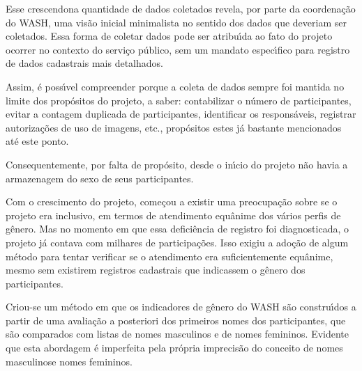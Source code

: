 \documentclass[
12pt,		%
openright,	%
twoside,  %
a4paper,			%
chapter=TITLE,		%
english,			%
french,				%
spanish,			%
brazil				%
]{USPSC-classe/USPSC}
\begin{document}
Esse \textquotedbl crescendo\textquotedbl  na quantidade de dados coletados revela, por parte da coordena\c{c}\~ao do WASH, uma vis\~ao inicial minimalista no sentido dos dados que deveriam ser coletados. Essa forma de coletar dados pode ser atribu\'{\i}da ao fato do projeto ocorrer no contexto do servi\c{c}o p\'ublico, sem um mandato espec\'{\i}fico para registro de dados cadastrais mais detalhados.









Assim, \'e poss\'{\i}vel compreender porque a coleta de dados sempre foi mantida no limite dos prop\'ositos do projeto, a saber: contabilizar o n\'umero de participantes, evitar a contagem duplicada de participantes, identificar os respons\'aveis, registrar autoriza\c{c}\~oes de uso de imagens, etc., prop\'ositos estes j\'a bastante mencionados at\'e este ponto.









Consequentemente, por falta de prop\'osito, desde o in\'{\i}cio do projeto n\~ao havia a armazenagem do sexo de seus participantes.









Com o crescimento do projeto, come\c{c}ou a existir uma preocupa\c{c}\~ao sobre se o projeto era inclusivo, em termos de atendimento equ\^anime dos v\'arios perfis de g\^enero. Mas no momento em que essa defici\^encia de registro foi diagnosticada, o projeto j\'a contava com milhares de participa\c{c}\~oes. Isso exigiu a ado\c{c}\~ao de algum m\'etodo para tentar verificar se o atendimento era suficientemente equ\^anime, mesmo sem existirem registros cadastrais que indicassem o g\^enero dos participantes.









Criou-se um m\'etodo em que os indicadores de g\^enero do WASH s\~ao constru\'{\i}dos a partir de uma avalia\c{c}\~ao a posteriori dos primeiros nomes dos participantes, que s\~ao comparados com listas de nomes masculinos e de nomes femininos. Evidente que esta abordagem \'e imperfeita pela pr\'opria imprecis\~ao do conceito de \textquotedbl nomes masculinos\textquotedbl  e \textquotedbl nomes femininos\textquotedbl .
\end{document}
